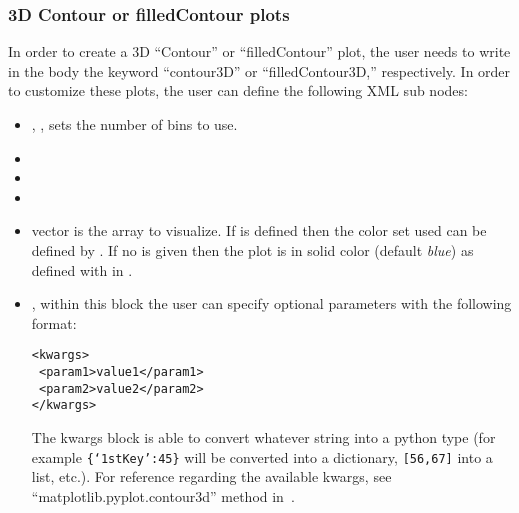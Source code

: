 \subsubsection{3D Contour or filledContour plots}
In order to create a 3D ``Contour'' or ``filledContour'' plot, the user needs
to write in the  body the keyword ``contour3D'' or ``filledContour3D,'' respectively.
%
In order to customize these plots, the user can define the following XML sub
nodes:
\begin{itemize}
  \item {}, , sets the
  number of bins to use.
  \item {}
  \item {}
  \item {}
  \item {} vector is the array to visualize.  If  is defined then the color set used can be defined by .
  If no  is given then the plot is in solid color (default \textit{blue}) as defined with  in .
  \item {}, within this block the user can specify optional
  parameters with the following format:

\begin{lstlisting}[style=XML]
<kwargs>
 <param1>value1</param1>
 <param2>value2</param2>
</kwargs>
\end{lstlisting}

  The kwargs block is able to convert whatever string into a python type (for
  example  \texttt{\{`1stKey':45\}} will
  be converted into a dictionary,
   \texttt{[56,67]}  into a list, etc.).
  For reference regarding the available kwargs, see
  ``matplotlib.pyplot.contour3d'' method in~\cite{MatPlotLib}.
\end{itemize}


